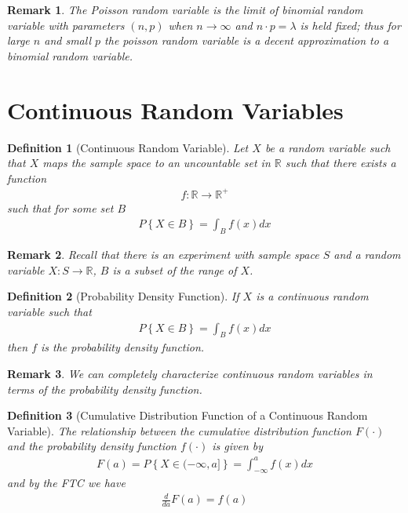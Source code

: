 \documentclass[11pt, oneside]{book}   	%
\newtheorem{definition}{Definition}[chapter]
\newtheorem{remark}{Remark}[chapter]
\begin{document}
\begin{spacing}{1.618}
\begin{remark}
	The Poisson random variable is the limit of binomial random variable with parameters $(n, p)$ when $n\to\infty$ and $n\cdot p=\lambda$ is held fixed; thus for large $n$ and small $p$ the poisson random variable is a decent approximation to a binomial random variable. 
\end{remark}

\section{Continuous Random Variables}

\begin{definition}[Continuous Random Variable]
	Let $X$ be a random variable such that $X$ maps the sample space to an uncountable set in $\mathbb{R}$ such that there exists a function
	\begin{alignat}{4}
		f:\mathbb{R}\to\mathbb{R}^+
	\end{alignat}
	such that for some set $B$ 
	\begin{alignat}{4}
		P\left\{X\in B\right\} = \int_{B}f(x)dx
	\end{alignat}
\end{definition}

\begin{remark}
	Recall that there is an experiment with sample space $S$ and a random variable $X:S\to\mathbb{R}$, $B$ is a subset of the range of $X$. 
\end{remark}

\begin{definition}[Probability Density Function]
	If $X$ is a continuous random variable such that 
	\begin{alignat}{4}
		P\left\{X\in B\right\}=\int_Bf(x)dx
	\end{alignat}
	then $f$ is the probability density function. 
\end{definition}

\begin{remark}
	We can completely characterize continuous random variables in terms of the probability density function.
\end{remark}

\begin{definition}[Cumulative Distribution Function of a Continuous Random Variable]
	The relationship between the cumulative distribution function $F(\cdot)$ and the probability density function $f(\cdot)$ is given by 
	\begin{alignat}{4}
		F(a)=P\left\{X\in (-\infty, a]\right\} = \int_{-\infty}^af(x)dx
	\end{alignat}
	and by the FTC we have
	\begin{alignat}{4}
		\frac{d}{da}F(a)=f(a)
	\end{alignat}
\end{definition}


\end{spacing}
\end{document}

